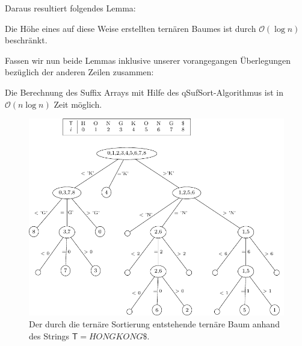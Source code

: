 Daraus resultiert folgendes Lemma:
\begin{lemma}
Die Höhe eines auf diese Weise erstellten ternären Baumes ist durch $\mathcal{O}(\log n)$ beschränkt.
\end{lemma}
Fassen wir nun beide Lemmas inklusive unserer vorangegangen Überlegungen bezüglich der anderen Zeilen zusammen: 
\begin{lemma}
Die Berechnung des Suffix Arrays mit Hilfe des qSufSort-\newline Algorithmus ist in $\mathcal{O}(n\log n)$ Zeit möglich.
\end{lemma}
\begin{figure}[t]
\centering
\includegraphics[scale=0.9]{kapitel/saca_algorithmen/qsufsort/Bilder/TerTree.pdf}
\caption{Der durch die ternäre Sortierung entstehende ternäre Baum anhand des Strings $\mathsf{T}=HONGKONG\$$.}
\label{terTree}
\end{figure}